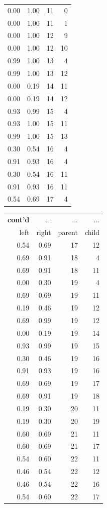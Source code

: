 \documentclass[fontscale=0.38,a0paper]{baposter}
\begin{document}
\begin{poster}
{\begin{tabular}{|rrrr|}
  0.00 & 1.00 &  11 &   0 \\ 
  0.00 & 1.00 &  11 &   1 \\ 
  0.00 & 1.00 &  12 &   9 \\ 
  0.00 & 1.00 &  12 &  10 \\ 
  0.99 & 1.00 &  13 &   4 \\ 
  0.99 & 1.00 &  13 &  12 \\ 
  0.00 & 0.19 &  14 &  11 \\ 
  0.00 & 0.19 &  14 &  12 \\ 
  0.93 & 0.99 &  15 &   4 \\ 
  0.93 & 1.00 &  15 &  11 \\ 
  0.99 & 1.00 &  15 &  13 \\ 
  0.30 & 0.54 &  16 &   4 \\ 
  0.91 & 0.93 &  16 &   4 \\ 
  0.30 & 0.54 &  16 &  11 \\ 
  0.91 & 0.93 &  16 &  11 \\ 
  0.54 & 0.69 &  17 &   4 \\ 
   \hline
\end{tabular}
\begin{tabular}{|rrrr|}
  \hline
    \textbf{cont'd} & ... &  ... & ... \\
left & right & parent & child \\ 
  \hline
  0.54 & 0.69 &  17 &  12 \\ 
  0.69 & 0.91 &  18 &   4 \\ 
  0.69 & 0.91 &  18 &  11 \\ 
  0.00 & 0.30 &  19 &   4 \\ 
  0.69 & 0.69 &  19 &  11 \\ 
  0.19 & 0.46 &  19 &  12 \\ 
  0.69 & 0.99 &  19 &  12 \\ 
  0.00 & 0.19 &  19 &  14 \\ 
  0.93 & 0.99 &  19 &  15 \\ 
  0.30 & 0.46 &  19 &  16 \\ 
  0.91 & 0.93 &  19 &  16 \\ 
  0.69 & 0.69 &  19 &  17 \\ 
  0.69 & 0.91 &  19 &  18 \\ 
  0.19 & 0.30 &  20 &  11 \\ 
  0.19 & 0.30 &  20 &  19 \\ 
  0.60 & 0.69 &  21 &  11 \\ 
  0.60 & 0.69 &  21 &  17 \\ 
  0.54 & 0.60 &  22 &  11 \\ 
  0.46 & 0.54 &  22 &  12 \\ 
  0.46 & 0.54 &  22 &  16 \\ 
  0.54 & 0.60 &  22 &  17 \\ 
   \hline
\end{tabular}

}
\end{poster}
\end{document}
